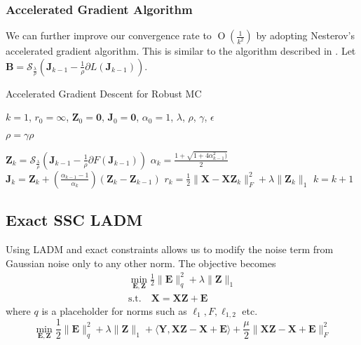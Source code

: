 \documentclass{article}
\newcommand{\BigO}[1]{\ensuremath{\operatorname{O}\left(#1\right)}}
\begin{document}
\subsubsection{Accelerated Gradient Algorithm}

We can further improve our convergence rate to $\BigO{\frac{1}{k^2}}$ by adopting Nesterov's accelerated gradient algorithm. This is similar to the algorithm described in \cite{ji2009accelerated}. Let $\mathbf B = \mathcal S_{\frac{\lambda}{\rho}}(\mathbf J_{k-1} - \frac1{\rho}\partial L(\mathbf J_{k-1}))$.

\begin{algorithm}
\caption{Accelerated Gradient Descent for Robust MC}
\begin{algorithmic}

\REQUIRE $k = 1$, $r_0 = \infty$, $\mathbf Z_0 = \mathbf 0$,  $\mathbf J_0 = \mathbf 0$, $\alpha_0 = 1$, $\lambda$, $\rho$, $\gamma$, $\epsilon$


	
		\STATE $\rho = \gamma \rho$	
	
	\ENDWHILE

	\STATE $\mathbf Z_k = \mathcal S_{\frac{\lambda}{\rho}}(\mathbf J_{k-1} - \frac1{\rho}\partial F(\mathbf J_{k-1}))$
	\STATE $\alpha_{k} = \frac{1 + \sqrt{1 + 4 \alpha_{k-1}^2)}}{2}$
	\STATE $\mathbf J_{k} = \mathbf Z_k + \left ( \frac{\alpha_{k-1} - 1}{\alpha_{k}} \right ) (\mathbf Z_k - \mathbf Z_{k-1})$
	\STATE $r_k = \frac12\|\mathbf X - \mathbf X\mathbf Z_k\|^2_F + \lambda\|\mathbf Z_k\|_{1}$
	\STATE $k = k + 1$
	
\ENDWHILE

\end{algorithmic}
\end{algorithm}


\subsection{Exact SSC LADM}

Using LADM and exact constraints allows us to modify the noise term from Gaussian noise only to any other norm. The objective becomes
\begin{align}
\min_{\mathbf{E, Z}} \frac12\|\mathbf E \|^2_q + \lambda\|\mathbf Z\|_{1} \\
\text{s.t.} \quad \mathbf{X = XZ + E} \nonumber
\end{align}
where $q$ is a placeholder for norms such as $\ell_1, F, \ell_{1,2}$ etc.
\[
\min_{\mathbf{E, Z}} \frac12\|\mathbf E \|^2_q + \lambda\|\mathbf Z\|_{1} + \langle \mathbf{Y, XZ - X + E } \rangle + \frac{\mu}{2} \|\mathbf{XZ - X + E } \|_F^2 
\]
\end{document}
